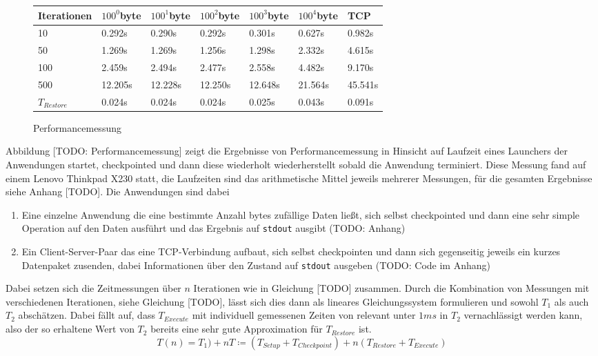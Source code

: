\documentclass[a4paper]{article}
\begin{document}
\begin{center}
\begin{figure}
\begin{tabular}{| l | l  l  l  l  l | l |}
    \toprule
    Iterationen & $100^0$byte & $100^1$byte & $100^2$byte & $100^3$byte & $100^4$byte & TCP \\
    \midrule
    10 & 0.292s & 0.290s & 0.292s & 0.301s & 0.627s & 0.982s \\
    50 & 1.269s & 1.269s & 1.256s & 1.298s & 2.332s & 4.615s \\
    100 & 2.459s & 2.494s & 2.477s & 2.558s & 4.482s & 9.170s \\
    500 & 12.205s & 12.228s & 12.250s & 12.648s & 21.564s & 45.541s \\
    \midrule
    $T_{Restore}$ & 0.024s & 0.024s & 0.024s & 0.025s & 0.043s & 0.091s \\
    \bottomrule
\end{tabular}
    \caption{Performancemessung} %
\end{figure}
\end{center}

Abbildung [TODO: Performancemessung] zeigt die Ergebnisse von Performancemessung in Hinsicht auf Laufzeit eines Launchers der Anwendungen startet, checkpointed und dann diese wiederholt wiederherstellt sobald die Anwendung terminiert. Diese Messung fand auf einem Lenovo Thinkpad X230 statt, die Laufzeiten sind das arithmetische Mittel jeweils mehrerer Messungen, für die gesamten Ergebnisse siehe Anhang [TODO].
Die Anwendungen sind dabei
\begin{enumerate}
    \item Eine einzelne Anwendung die eine bestimmte Anzahl bytes zufällige Daten ließt, sich selbst checkpointed und dann eine sehr simple Operation auf den Daten ausführt und das Ergebnis auf \texttt{stdout} ausgibt (TODO: Anhang)
    \item Ein Client-Server-Paar das eine TCP-Verbindung aufbaut, sich selbst checkpointen und dann sich gegenseitig jeweils ein kurzes Datenpaket zusenden, dabei Informationen über den Zustand auf \texttt{stdout} ausgeben (TODO: Code im Anhang)
\end{enumerate}
Dabei setzen sich die Zeitmessungen über $n$ Iterationen wie in Gleichung [TODO] zusammen. 
Durch die Kombination von Messungen mit verschiedenen Iterationen, siehe Gleichung [TODO], lässt sich dies dann als lineares Gleichungssystem formulieren und sowohl $T_1$ als auch $T_2$ abschätzen. 
Dabei fällt auf, dass $T_{Execute}$ mit individuell gemessenen Zeiten von relevant unter $1ms$ in $T_2$ vernachlässigt werden kann, also der so erhaltene Wert von $T_2$ bereits eine sehr gute Approximation für $T_{Restore}$ ist. 
\begin{equation}
    T(n) = T_1) + n T \coloneqq (T_{Setup} + T_{Checkpoint}) + n (T_{Restore} + T_{Execute})
\end{equation}
\end{document}
